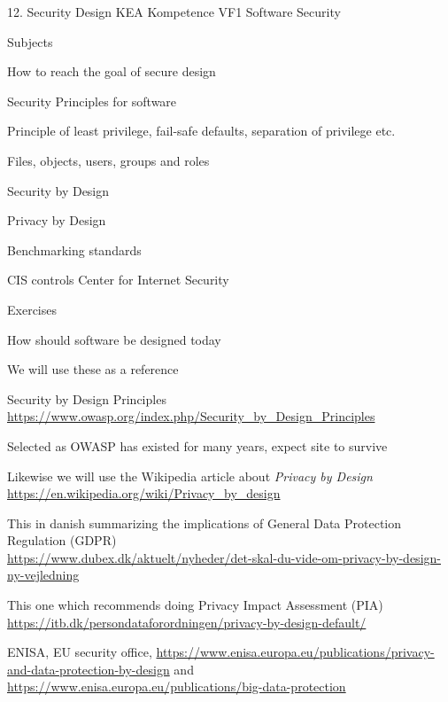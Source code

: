 \documentclass[Screen16to9,17pt]{foils}
\begin{document}
\mytitlepage
{12. Security Design}
{KEA Kompetence VF1 Software Security}


\begin{list1}
\item Subjects
\begin{list2}
\item How to reach the goal of secure design
\item Security Principles for software
\item Principle of least privilege, fail-safe defaults, separation of privilege etc.
\item Files, objects, users, groups and roles
\item Security by Design
\item Privacy by Design
\item Benchmarking standards
\item CIS controls Center for Internet Security
\end{list2}
\item Exercises
\begin{list2}
\item How should software be designed today
\end{list2}
\end{list1}


\begin{list1}
\item We will use these as a reference
\item Security by Design Principles\\
\url{https://www.owasp.org/index.php/Security_by_Design_Principles}
\item Selected as OWASP has existed for many years, expect site to survive

\item Likewise we will use the Wikipedia article about \emph{Privacy by Design}\\
\url{https://en.wikipedia.org/wiki/Privacy_by_design}
\end{list1}



\begin{list2}
\item This in danish summarizing the implications of General Data Protection Regulation (GDPR)\\
{\footnotesize\url{https://www.dubex.dk/aktuelt/nyheder/det-skal-du-vide-om-privacy-by-design-ny-vejledning}}
\item This one which recommends doing Privacy Impact Assessment (PIA)\\
{\footnotesize\url{https://itb.dk/persondataforordningen/privacy-by-design-default/}}
\item ENISA, EU security office, {\footnotesize\url{https://www.enisa.europa.eu/publications/privacy-and-data-protection-by-design}} and {\footnotesize\url{https://www.enisa.europa.eu/publications/big-data-protection}}
\end{list2}
\end{document}
